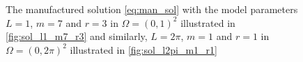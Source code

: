 \begin{figure}[tbh!]
    \begin{minipage}{.5\linewidth}
    \centering
    \end{minipage}%
    \begin{minipage}{.5\linewidth}
    \centering
    \end{minipage}%
    \centering
    \caption{The manufactured solution \eqref{eq:man_sol} with the model parameters $L=1$, $m=7$ and $r=3$ in $\Omega = (0,1)^2$ illustrated in \ref{fig:sol_l1_m7_r3} and similarly, $L=2 \pi$, $m=1$ and $r=1$ in $\Omega = (0,2\pi)^2$ illustrated
    in \ref{fig:sol_l2pi_m1_r1}}
\end{figure}

